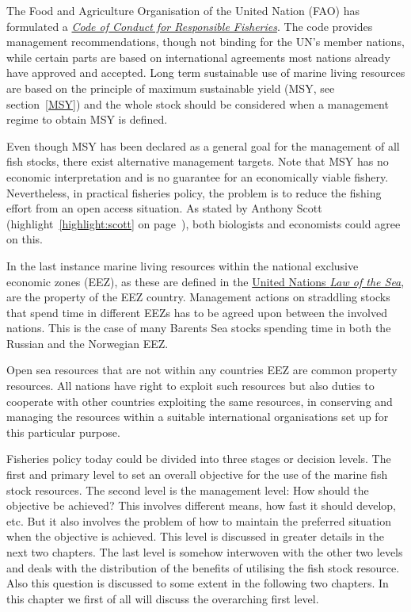 \documentclass[11pt,fleqn]{book} %
\begin{document}
The Food and Agriculture Organisation of the United Nation (FAO) has formulated a \href{http://www.fao.org/publications/card/en/c/e6cf549d-589a-5281-ac13-766603db9c03}{\textit{Code of Conduct for Responsible Fisheries}}. The code provides management recommendations, though not binding for the UN's member nations, while certain parts are based on international agreements most nations already have approved and accepted. Long term sustainable use of marine living resources are based on the principle of maximum sustainable yield (MSY, see section~\ref{MSY}) and the whole stock should be considered when a management regime to obtain MSY is defined. 

Even though MSY has been declared as a general goal for the management of all fish stocks, there exist alternative management targets. Note that MSY has no economic interpretation and is no guarantee for an economically viable fishery. Nevertheless, in practical fisheries policy, the problem is to reduce the fishing effort from an open access situation. As stated by Anthony Scott (highlight~\ref{highlight:scott} on page~\pageref{highlight:scott}), both biologists and economists could agree on this.

In the last instance marine living resources within the national exclusive economic zones (EEZ), as these are defined in the \href{https://www.un.org/en/sections/issues-depth/oceans-and-law-sea/}{United Nations \textit{Law of the Sea}}, are the property of the EEZ country. Management actions on straddling stocks that spend time in different EEZs has to be agreed upon between the involved nations. This is the case of many Barents Sea stocks spending time in both the Russian and the Norwegian EEZ.

Open sea resources that are not within any countries EEZ are common property resources. All nations have right to exploit such resources but also duties to cooperate with other countries exploiting the same resources, in conserving and managing the resources within a suitable international organisations set up for this particular purpose.

Fisheries policy today could be divided into three stages or decision levels. The first and primary level to set an overall objective for the use of the marine fish stock resources. The second level is the management level: How should the objective be achieved? This involves different means, how fast it should develop, etc. But it also involves the problem of how to maintain the preferred situation when the objective is achieved. This level is discussed in greater details in the next two chapters. The last level is somehow interwoven with the other two levels and deals with the distribution of the benefits of utilising the fish stock resource. Also this question is discussed to some extent in the following two chapters. In this chapter we first of all will discuss the overarching first level.
\end{document}
